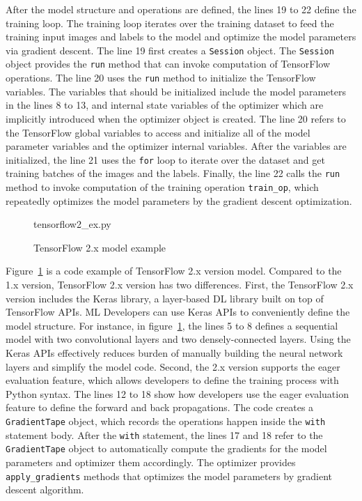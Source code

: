 After the model structure and operations are defined, 
the lines 19 to 22 define the training loop.
The training loop iterates over the training dataset to feed the training
input images and labels to the model and optimize the model parameters via
gradient descent.
The line 19 first creates a {\tt Session} object.
The {\tt Session} object provides the {\tt run} method that can invoke
computation of TensorFlow operations.
The line 20 uses the {\tt run} method to initialize the TensorFlow variables.
The variables that should be initialized
include the model parameters in the lines 8 to 13, and
internal state variables of the optimizer which are implicitly introduced
when the optimizer object is created.
The line 20 refers to the TensorFlow global variables to access and initialize
all of the model parameter variables and the optimizer internal variables.
After the variables are initialized, the line 21 uses the {\tt for} loop
to iterate over the dataset and get training batches of the images and the
labels. Finally, the line 22 calls the {\tt run} method to
invoke computation of the training operation {\tt train\_op},
which repeatedly optimizes the model parameters by the gradient descent
optimization.


\begin{figure}[ht!]

{tensorflow2_ex.py}
  \caption{TensorFlow 2.x model example}
\label{fig:back:tf2}
\end{figure}

Figure~\ref{fig:back:tf2} is a code example of TensorFlow 2.x version model.
Compared to the 1.x version, TensorFlow 2.x version has two differences.
First, the TensorFlow 2.x version includes the Keras library, a layer-based
DL library built on top of TensorFlow APIs.
ML Developers can use Keras APIs to conveniently define the model structure.
For instance, in figure~\ref{fig:back:tf2},
the lines 5 to 8 defines a sequential model with two convolutional layers and
two densely-connected layers.
Using the Keras APIs effectively reduces burden of manually building the neural
network layers and simplify the model code.
Second, the 2.x version supports the eager evaluation feature, which allows
developers to define the training process with Python syntax.
The lines 12 to 18 show how developers use the eager evaluation feature
to define the forward and back propagations. 
The code creates a {\tt GradientTape} object, which records the operations
happen inside the {\tt with} statement body.
After the {\tt with} statement, the lines 17 and 18 refer to the 
{\tt GradientTape} object to automatically compute the gradients 
for the model parameters and optimizer them accordingly.
The optimizer provides {\tt apply\_gradients} methods that optimizes 
the model parameters by gradient descent algorithm. 

